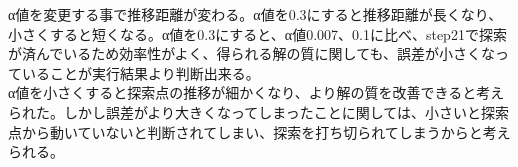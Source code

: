 α値を変更する事で推移距離が変わる。α値を0.3にすると推移距離が長くなり、小さくすると短くなる。α値を0.3にすると、α値0.007、0.1に比べ、step21で探索が済んでいるため効率性がよく、得られる解の質に関しても、誤差が小さくなっていることが実行結果より判断出来る。\\
α値を小さくすると探索点の推移が細かくなり、より解の質を改善できると考えられた。しかし誤差がより大きくなってしまったことに関しては、小さいと探索点から動いていないと判断されてしまい、探索を打ち切られてしまうからと考えられる。

